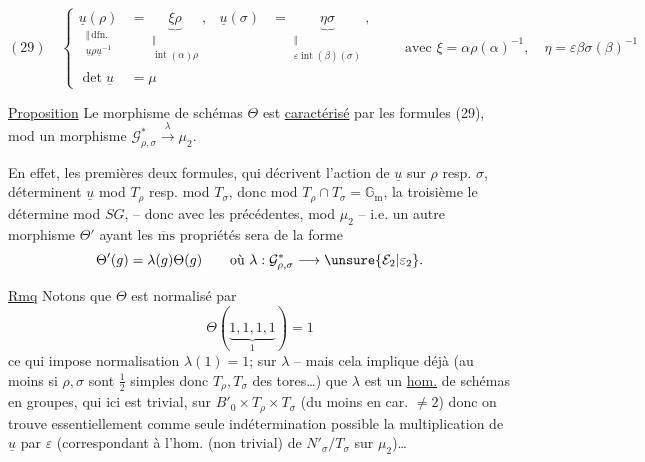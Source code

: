 
\[
(29)\quad
\left\{\begin{aligned}
\underset{\substack{\Vert\,\mathrm{dfn.}\\\underline{u}\rho\underline{u}^{-1}}}{\underline{u}(\rho)}
 &=\underset{\substack{\Vert\\\operatorname{int}(\alpha)\rho}}{\underbrace{\xi\rho}},
 &\underline{u}(\sigma)&=\underset{\substack{\Vert\\\varepsilon\operatorname{int}(\beta)(\sigma)}}{\underbrace{\eta\sigma}},\\[1ex]
\det\underline{u}&=\mu
\end{aligned}\right.
\qquad\text{avec }\xi=\alpha\rho(\alpha)^{-1},\quad
\eta=\varepsilon\beta\sigma(\beta)^{-1}
\]

\uline{Proposition} Le morphisme de schémas $\Theta$ est
\uline{caractérisé} par les formules (29), mod un morphisme
$\mathcal{G}_{\rho,\sigma}^{*}\xrightarrow{\lambda}\mu_2$.

En effet, les premières deux formules, qui décrivent l'action de
$\underline{u}$ sur $\rho$ resp. $\sigma$, déterminent $\underline{u}$ mod
$T_\rho$ resp. mod $T_\sigma$, donc  mod
$T_\rho\cap T_\sigma=\mathbb{G}_{\mathrm m}$, la troisième le détermine
mod $SG$, -- donc avec les précédentes, mod $\mu_2$ -- i.e. un autre
morphisme $\Theta'$ ayant les $\overline{\mathrm m}\mathrm{s}$ propriétés
sera de la forme
\[
\Theta'(g)=\lambda(g)\Theta(g)\qquad\text{où }\lambda:
\mathcal{G}_{\rho,\sigma}^{*}\longrightarrow\unsure{\mathcal{E}_2|\varepsilon_2}.
\]

\uline{Rmq} Notons  que 
$\Theta$ est normalisé par
\[
\Theta(\underbrace{1,1,1,1}_{1})=1
\]
ce qui impose  normalisation
$\lambda(1)=1$; sur $\lambda$ -- mais  cela
implique déjà (au moins si $\rho,\sigma$ sont $\frac12$ simples donc
$T_\rho,T_\sigma$ des tores\ldots) que $\lambda$ est un \uline{hom.}
de schémas en groupes, qui ici est  trivial,
sur  $B'_0\times T_\rho\times T_\sigma$
(du moins en car. $\ne2$) donc on trouve essentiellement comme seule
indétermination possible la multiplication  de
$\underline{u}$ par $\varepsilon$ 
(correspondant à l'hom. (non trivial) de
$N'_\sigma/T_\sigma$ sur $\mu_2$)\ldots\ 

